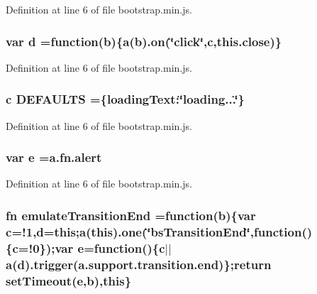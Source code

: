 Definition at line 6 of file bootstrap.\+min.\+js.

\hypertarget{a00029_aeb337d295abaddb5ec3cb34cc2e2bbc9}{}
\subsubsection[{d}]{\setlength{\rightskip}{0pt plus 5cm}var d =function({\bf b})\{{\bf a}({\bf b}).on(\char`\"{}click\char`\"{},c,{\bf this.\+close})\}}\label{a00029_aeb337d295abaddb5ec3cb34cc2e2bbc9}


Definition at line 6 of file bootstrap.\+min.\+js.

\hypertarget{a00029_a6c1cf0be5e5383617ddc5efdfdc8c651}{}
\subsubsection[{D\+E\+F\+A\+U\+L\+T\+S}]{ {\bf c} D\+E\+F\+A\+U\+L\+T\+S =\{loading\+Text\+:\char`\"{}loading...\char`\"{}\}}\label{a00029_a6c1cf0be5e5383617ddc5efdfdc8c651}


Definition at line 6 of file bootstrap.\+min.\+js.

\hypertarget{a00029_ab5902775854a8b8440bcd25e0fe1c120}{}
\subsubsection[{e}]{\setlength{\rightskip}{0pt plus 5cm}var e ={\bf a.\+fn.\+alert}}\label{a00029_ab5902775854a8b8440bcd25e0fe1c120}


Definition at line 6 of file bootstrap.\+min.\+js.

\hypertarget{a00029_a006fe6a2a254572b367123c6db401ff3}{}
\subsubsection[{emulate\+Transition\+End}]{ {\bf fn} emulate\+Transition\+End =function({\bf b})\{var {\bf c}=!1,{\bf d}=this;{\bf a}(this).one(\char`\"{}bs\+Transition\+End\char`\"{},function()\{{\bf c}=!0\});var {\bf e}=function()\{{\bf c}$\vert$$\vert${\bf a}({\bf d}).trigger(a.\+support.\+transition.\+end)\};return set\+Timeout({\bf e},{\bf b}),this\}}\label{a00029_a006fe6a2a254572b367123c6db401ff3}


